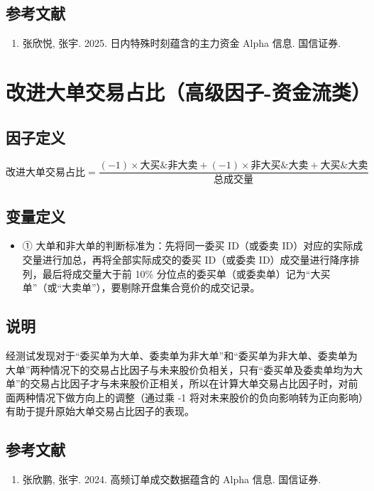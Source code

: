 \documentclass{article}
\begin{document}
\subsection{参考文献}
\begin{enumerate}
    \item 张欣悦, 张宇. 2025. 日内特殊时刻蕴含的主力资金 Alpha 信息. 国信证券.
\end{enumerate}

\section{改进大单交易占比（高级因子-资金流类）}

\subsection{因子定义}
\begin{equation}
    \text{改进大单交易占比} = \frac{(-1) \times \text{大买} \& \text{非大卖} + (-1) \times \text{非大买}\&\text{大卖} + \text{大买}\&\text{大卖}}{\text{总成交量}}
\end{equation}

\subsection{变量定义}
\begin{itemize}
    \item ① 大单和非大单的判断标准为：先将同一委买 ID（或委卖 ID）对应的实际成交量进行加总，再将全部实际成交的委买 ID（或委卖 ID）成交量进行降序排列，最后将成交量大于前 10\% 分位点的委买单（或委卖单）记为“大买单”（或“大卖单”），要剔除开盘集合竞价的成交记录。
\end{itemize}

\subsection{说明}
经测试发现对于“委买单为大单、委卖单为非大单”和“委买单为非大单、委卖单为大单”两种情况下的交易占比因子与未来股价负相关，只有“委买单及委卖单均为大单”的交易占比因子才与未来股价正相关，所以在计算大单交易占比因子时，对前面两种情况下做方向上的调整（通过乘 -1 将对未来股价的负向影响转为正向影响）有助于提升原始大单交易占比因子的表现。

\subsection{参考文献}
\begin{enumerate}
    \item 张欣鹏, 张宇. 2024. 高频订单成交数据蕴含的 Alpha 信息. 国信证券.
\end{enumerate}
\end{document}
